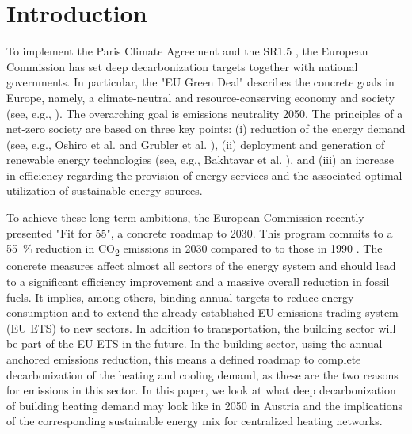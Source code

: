 \section{Introduction}
To implement the Paris Climate Agreement \cite{agreement2015paris} and the SR1.5 \cite{edenhofer2011ipcc}, the European Commission has set deep decarbonization targets together with national governments. In particular, the "EU Green Deal" describes the concrete goals in Europe, namely, a climate-neutral and resource-conserving economy and society (see, e.g., \cite{kemfert2019green}). The overarching goal is emissions neutrality 2050. The principles of a net-zero society are based on three key points: (i) reduction of the energy demand (see, e.g., Oshiro et al. \cite{oshiro2021enabling} and Grubler et al. \cite{grubler2018low}), (ii) deployment and generation of renewable energy technologies (see, e.g., Bakhtavar et al. \cite{bakhtavar2020assessment}), and (iii) an increase in efficiency regarding the provision of energy services and the associated optimal utilization of sustainable energy sources.\vspace{0.3cm}

To achieve these long-term ambitions, the European Commission recently presented "Fit for 55", a concrete roadmap to 2030. This program commits to a \SI{55}{\%} reduction in CO\textsubscript{2} emissions in 2030 compared to to those in 1990 \cite{european_commission_european_2019}. The concrete measures affect almost all sectors of the energy system and should lead to a significant efficiency improvement and a massive overall reduction in fossil fuels. It implies, among others, binding annual targets to reduce energy consumption and to extend the already established EU emissions trading system (EU ETS) to new sectors. In addition to transportation, the building sector will be part of the EU ETS in the future. In the building sector, using the annual anchored emissions reduction, this means a defined roadmap to complete decarbonization of the heating and cooling demand, as these are the two reasons for emissions in this sector. In this paper, we look at what deep decarbonization of building heating demand may look like in 2050 in Austria and the implications of the corresponding sustainable energy mix for centralized heating networks.

